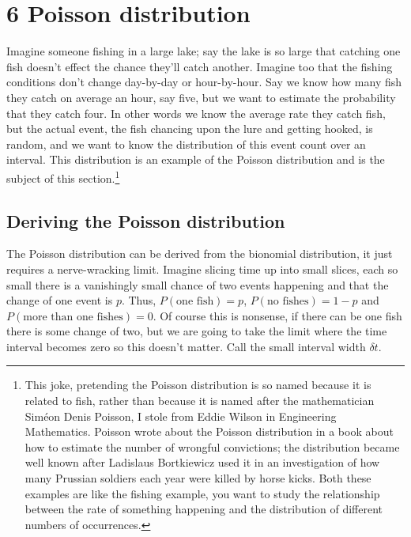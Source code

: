 \documentclass[11pt,a4paper]{scrartcl}
\begin{document}
\section*{6 Poisson distribution}

Imagine someone fishing in a large lake; say the lake is so large that
catching one fish doesn't effect the chance they'll catch
another. Imagine too that the fishing conditions don't change
day-by-day or hour-by-hour. Say we know how many fish they catch on
average an hour, say five, but we want to estimate the probability
that they catch four. In other words we know the average rate they
catch fish, but the actual event, the fish chancing upon the lure and
getting hooked, is random, and we want to know the distribution of this
event count over an interval. This distribution is an example of the
Poisson distribution and is the subject of this section.\footnote{This
  joke, pretending the Poisson distribution is so named because it is
  related to fish, rather than because it is named after the
  mathematician Sim\'{e}on Denis Poisson, I stole from Eddie Wilson in
  Engineering Mathematics. Poisson wrote about the Poisson
  distribution in a book about how to estimate the number of wrongful
  convictions; the distribution became well known after Ladislaus
  Bortkiewicz used it in an investigation of how many Prussian
  soldiers each year were killed by horse kicks. Both these examples
  are like the fishing example, you want to study the relationship
  between the rate of something happening and the distribution of
  different numbers of occurrences.}

\subsection*{Deriving the Poisson distribution}

The Poisson distribution can be derived from the bionomial
distribution, it just requires a nerve-wracking limit. Imagine slicing
time up into small slices, each so small there is a vanishingly small
chance of two events happening and that the change of one event is
$p$. Thus, $P(\mbox{one fish})=p$, $P(\mbox{no fishes})=1-p$ and
$P(\mbox{more than one fishes})=0$. Of course this is nonsense, if
there can be one fish there is some change of two, but we are going to
take the limit where the time interval becomes zero so this doesn't
matter. Call the small interval width $\delta t$.
\end{document}
